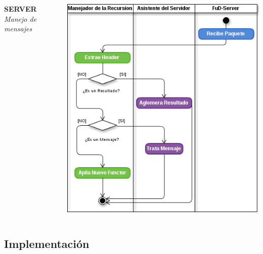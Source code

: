     \begin{frame}
    \begin{columns}[T]
        \begin{column}{.3\textwidth}
            \begin{center}
                \textbf{SERVER}\\
                \textit{Manejo de mensajes}
            \end{center}
        \end{column}
        \begin{column}{.7\textwidth}
            \centering
            \includegraphics[scale=0.39]{images/ActivityRecAbs-3.png}
        \end{column}
    \end{columns}
\end{frame}


\subsection{Implementación}


